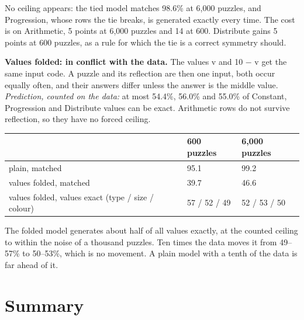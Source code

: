 No ceiling appears: the tied model matches 98.6\% at 6,000 puzzles, and Progression, whose rows the tie breaks, is generated exactly every time. The cost is on Arithmetic, 5 points at 6,000 puzzles and 14 at 600. Distribute gains 5 points at 600 puzzles, as a rule for which the tie is a correct symmetry should.

\textbf{Values folded: in conflict with the data.} The values v and 10 − v get the same input code. A puzzle and its reflection are then one input, both occur equally often, and their answers differ unless the answer is the middle value. \emph{Prediction, counted on the data:} at most 54.4\%, 56.0\% and 55.0\% of Constant, Progression and Distribute values can be exact. Arithmetic rows do not survive reflection, so they have no forced ceiling.

\begin{center}\small
\begin{tabular}{@{}lll@{}}
\toprule
 & 600 puzzles & 6,000 puzzles \\
\midrule
plain, matched & 95.1 & 99.2 \\
values folded, matched & 39.7 & 46.6 \\
values folded, values exact (type / size / colour) & 57 / 52 / 49 & 52 / 53 / 50 \\
\bottomrule
\end{tabular}
\end{center}

The folded model generates about half of all values exactly, at the counted ceiling to within the noise of a thousand puzzles. Ten times the data moves it from 49–57\% to 50–53\%, which is no movement. A plain model with a tenth of the data is far ahead of it.

\section{Summary}\label{sec:6.8}

